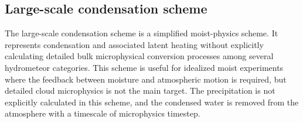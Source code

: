 \subsection{Large-scale condensation scheme}
\label{subsec:physics_mp_lscond}
The large-scale condensation scheme is a simplified moist-physics scheme.
It represents condensation and associated latent heating without explicitly calculating detailed bulk microphysical conversion processes among several hydrometeor categories.
This scheme is useful for idealized moist experiments where the feedback between moisture and atmospheric motion is required, 
but detailed cloud microphysics is not the main target.
The precipitation is not explicitly calculated in this scheme, 
and the condensed water is removed from the atmosphere with a timescale of microphysics timestep.


